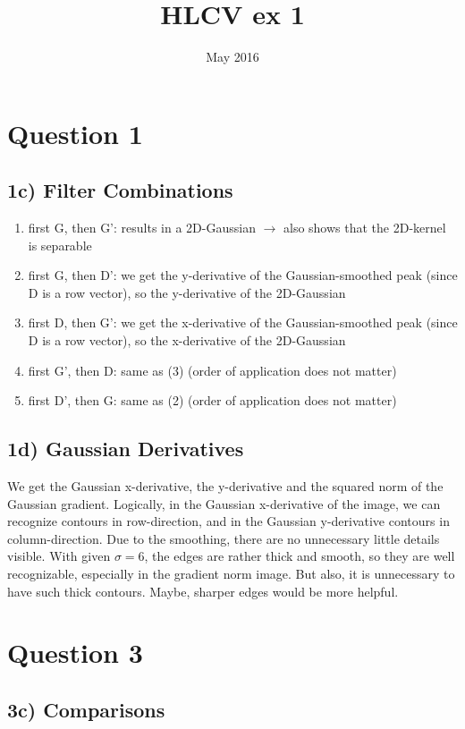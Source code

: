 \documentclass{article}
\title{HLCV ex 1}
\date{May 2016}
\begin{document}
\section*{Question 1}

\subsection*{1c) Filter Combinations}
\begin{enumerate}[(1)]
    \item first G, then G': results in a 2D-Gaussian
    $\rightarrow$ also shows that the 2D-kernel is separable
    \item first G, then D': we get the y-derivative of the Gaussian-smoothed peak (since D is a row vector), so the y-derivative of the 2D-Gaussian
    \item first D, then G': we get the x-derivative of the Gaussian-smoothed peak (since D is a row vector), so the x-derivative of the 2D-Gaussian
    \item first G', then D: same as (3) (order of application does not matter)
    \item first D', then G: same as (2) (order of application does not matter)
\end{enumerate}

\subsection*{1d) Gaussian Derivatives}
We get the Gaussian x-derivative, the y-derivative and the squared norm of the Gaussian gradient. Logically, in the Gaussian x-derivative of the image, we can recognize contours in row-direction, and in the Gaussian y-derivative contours in column-direction. Due to the smoothing, there are no unnecessary little details visible. 
With given $\sigma=6$, the edges are rather thick and smooth, so they are well recognizable, especially in the gradient norm image. But also, it is unnecessary to have such thick contours. Maybe, sharper edges would be more helpful.

\newpage
\section*{Question 3}

\subsection*{3c) Comparisons} 
\end{document}
